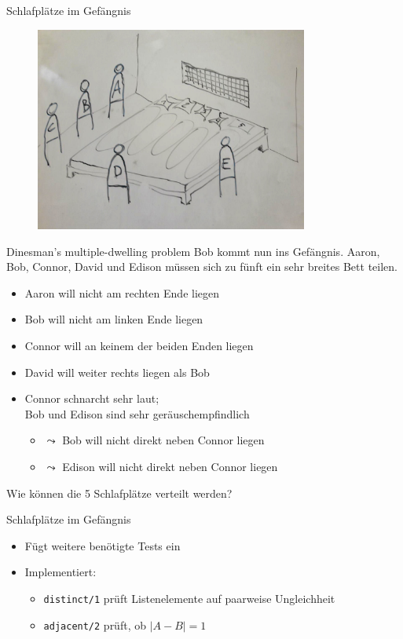\documentclass{beamer}
\begin{document}
\begin{frame}{Schlafplätze im Gefängnis}
	\begin{figure}
		\includegraphics[width=0.8\textwidth]{images/bett}
	\end{figure}
\end{frame}

\begin{frame}{Dinesman's multiple-dwelling problem}
	Bob kommt nun ins Gefängnis.
	Aaron, Bob, Connor, David und Edison müssen sich zu fünft ein sehr breites Bett teilen.

	\begin{itemize}
		\item Aaron will nicht am rechten Ende liegen
		\item Bob will nicht am linken Ende liegen
		\item Connor will an keinem der beiden Enden liegen
		\item David will weiter rechts liegen als Bob
		\item Connor schnarcht sehr laut;\\Bob und Edison sind sehr geräuschempfindlich
		\begin{itemize}
			\item $\leadsto$ Bob will nicht direkt neben Connor liegen
			\item $\leadsto$ Edison will nicht direkt neben Connor liegen
		\end{itemize}
	\end{itemize}

	Wie können die 5 Schlafplätze verteilt werden?
\end{frame}

\begin{frame}{Schlafplätze im Gefängnis}

	\begin{itemize}
		\item Fügt weitere benötigte Tests ein
		\item Implementiert:
		\begin{itemize}
			\item \texttt{distinct/1} prüft Listenelemente auf paarweise Ungleichheit
			\item \texttt{adjacent/2} prüft, ob $|A - B| = 1$
		\end{itemize}
	\end{itemize}
\end{frame}
\end{document}
